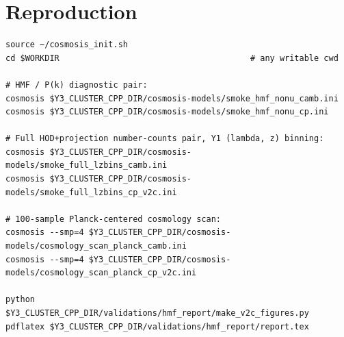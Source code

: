 \documentclass[11pt]{article}
\begin{document}
\section*{Reproduction}

\begin{verbatim}
source ~/cosmosis_init.sh
cd $WORKDIR                                       # any writable cwd

# HMF / P(k) diagnostic pair:
cosmosis $Y3_CLUSTER_CPP_DIR/cosmosis-models/smoke_hmf_nonu_camb.ini
cosmosis $Y3_CLUSTER_CPP_DIR/cosmosis-models/smoke_hmf_nonu_cp.ini

# Full HOD+projection number-counts pair, Y1 (lambda, z) binning:
cosmosis $Y3_CLUSTER_CPP_DIR/cosmosis-models/smoke_full_lzbins_camb.ini
cosmosis $Y3_CLUSTER_CPP_DIR/cosmosis-models/smoke_full_lzbins_cp_v2c.ini

# 100-sample Planck-centered cosmology scan:
cosmosis --smp=4 $Y3_CLUSTER_CPP_DIR/cosmosis-models/cosmology_scan_planck_camb.ini
cosmosis --smp=4 $Y3_CLUSTER_CPP_DIR/cosmosis-models/cosmology_scan_planck_cp_v2c.ini

python   $Y3_CLUSTER_CPP_DIR/validations/hmf_report/make_v2c_figures.py
pdflatex $Y3_CLUSTER_CPP_DIR/validations/hmf_report/report.tex
\end{verbatim}
\end{document}
